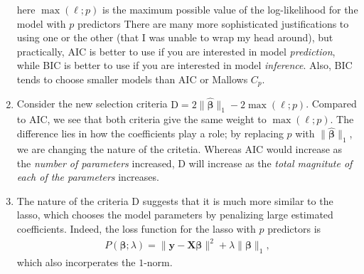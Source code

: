 \documentclass[10pt]{article}
\begin{document}
\begin{enumerate}
    here \(\max(\ell;p)\) is the maximum possible value of the log-likelihood for the model with \(p\) predictors
    There are many more sophisticated justifications to using one or the other (that I was unable to wrap my head around), but practically, AIC is 
    better to use if you are interested in model \textsl{prediction}, while BIC is better to use if you are interested in model \textsl{inference}. 
    Also, BIC tends to choose smaller models than AIC or Mallows \(C_p\).
    \item Consider the new selection criteria \(\mathrm{D} = 2 \| \hat{\bm{\beta}} \|_1 - 2 \max(\ell;p)\). Compared to AIC, we see that both criteria give the 
    same weight to \(\max(\ell;p)\). The difference lies in how the coefficients play a role; by replacing \(p\) with \(\|\hat{\bm{\beta}}\|_1\), we are changing 
    the nature of the critetia. Whereas AIC would increase as the \textsl{number of parameters} increased, \(\mathrm{D}\) will increase as the 
    \textsl{total magnitute of each of the parameters} increases. 
    \item The nature of the criteria \(\mathrm{D}\) suggests that it is much more similar to the lasso, which chooses the model parameters 
    by penalizing large estimated coefficients. Indeed, the loss function for the lasso with \(p\) predictors is 
    \begin{align*}
        P(\bm{\beta};\lambda)
        = \| \mathbf{y} - \mathbf{X}\bm{\beta} \|^2 + \lambda \| \bm{\beta} \|_1,
    \end{align*}
    which also incorperates the \(1\)-norm. 
\end{enumerate}
\end{document}
